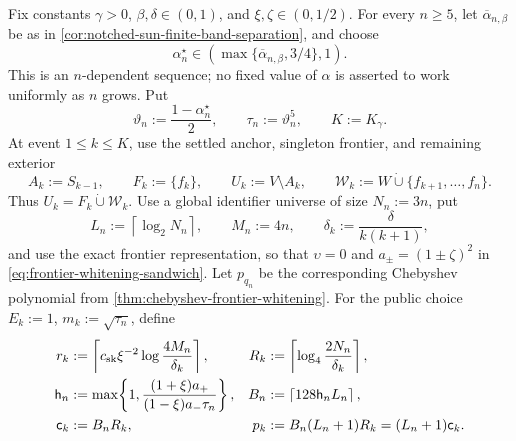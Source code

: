 \begin{proposition}
\label{prop:notched-sun-fresh-dense-coded-table-charge}
Fix constants $\gamma>0$, $\beta,\delta\in(0,1)$, and
$\xi,\zeta\in(0,1/2)$.  For every $n\geq5$, let
$\overline\alpha_{n,\beta}$ be as in
\cref{cor:notched-sun-finite-band-separation}, and choose
\begin{equation}
 \alpha_n^\star\in
 \left(\max\{\overline\alpha_{n,\beta},3/4\},1\right).
 \label{eq:notched-sun-fresh-table-alpha-sequence}
\end{equation}
This is an $n$-dependent sequence; no fixed value of $\alpha$ is asserted to
work uniformly as $n$ grows.  Put
\begin{equation*}
 \vartheta_n:=\frac{1-\alpha_n^\star}{2},
 \qquad
 \tau_n:=\vartheta_n^5,
 \qquad
 K:=K_\gamma.
\end{equation*}
At event $1\leq k\leq K$, use the settled anchor, singleton frontier, and
remaining exterior
\begin{equation}
 A_k:=S_{k-1},
 \qquad F_k:=\{f_k\},
 \qquad U_k:=V\setminus A_k,
 \qquad
 \mathcal W_k:=W\mathbin{\dot\cup}\{f_{k+1},\ldots,f_n\}.
 \label{eq:notched-sun-fresh-table-event}
\end{equation}
Thus $U_k=F_k\mathbin{\dot\cup}\mathcal W_k$.  Use a global identifier
universe of size $N_n:=3n$, put
\begin{equation*}
 L_n:=\left\lceil\log_2N_n\right\rceil,
 \qquad M_n:=4n,
 \qquad
 \delta_k:=\frac{\delta}{k(k+1)},
\end{equation*}
and use the exact frontier representation, so that $\upsilon=0$ and
$a_\pm=(1\pm\zeta)^2$ in
\cref{eq:frontier-whitening-sandwich}.  Let $p_{q_n}$ be the corresponding
Chebyshev polynomial from
\cref{thm:chebyshev-frontier-whitening}.  For the public choice
$E_k:=1$, $m_k:=\sqrt{\tau_n}$, define
\begin{align}
 r_k
 &:=\left\lceil
      c_{\rm sk}\xi^{-2}\log\frac{4M_n}{\delta_k}
    \right\rceil,
 &
 R_k
 &:=\left\lceil\log_4\frac{2N_n}{\delta_k}\right\rceil,
 \label{eq:notched-sun-fresh-table-probe-counts}\\
 \mathsf h_n
 &:=\max\!\left\{1,
      \frac{(1+\xi)a_+}{(1-\xi)a_-\tau_n}
    \right\},
 &
 B_n
 &:=\left\lceil128\mathsf h_nL_n\right\rceil,
 \label{eq:notched-sun-fresh-table-buckets}\\
 \mathsf c_k&:=B_nR_k,
 &
 p_k&:=B_n(L_n+1)R_k=(L_n+1)\mathsf c_k.
 \label{eq:notched-sun-fresh-table-dimensions}
\end{align}


\end{proposition}
